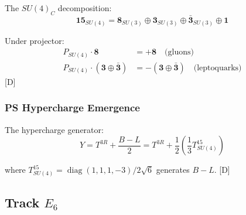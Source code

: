 \documentclass[11pt,a4paper]{article}
\newcommand{\tagD}{\textcolor{blue!70!black}{[D]}}
\DeclareMathOperator{\diag}{diag}
\begin{document}
The $SU(4)_C$ decomposition:
\begin{equation}
\label{eq:su4-decomp}
\mathbf{15}_{SU(4)} = \mathbf{8}_{SU(3)} \oplus \mathbf{3}_{SU(3)} \oplus \bar{\mathbf{3}}_{SU(3)} \oplus \mathbf{1}
\end{equation}

Under projector:
\begin{align}
\label{eq:ps-proj-su3}
P_{SU(4)} \cdot \mathbf{8} &= +\mathbf{8} \quad \text{(gluons)} \\
\label{eq:ps-proj-lq}
P_{SU(4)} \cdot (\mathbf{3} \oplus \bar{\mathbf{3}}) &= -(\mathbf{3} \oplus \bar{\mathbf{3}}) \quad \text{(leptoquarks)}
\end{align}
\tagD

\subsubsection{PS Hypercharge Emergence}

The hypercharge generator:
\begin{equation}
\label{eq:ps-hypercharge}
Y = T^{3R} + \frac{B-L}{2} = T^{3R} + \frac{1}{2}\left(\frac{1}{3}T^{15}_{SU(4)}\right)
\end{equation}

where $T^{15}_{SU(4)} = \diag(1,1,1,-3)/2\sqrt{6}$ generates $B-L$. \tagD

\subsection{Track $E_6$}
\end{document}
